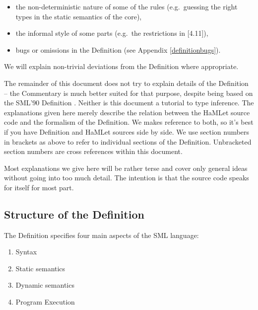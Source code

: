 \documentclass[twoside,titlepage]{article}
\begin{document}
\begin{itemize}
\setlength{\parskip}{0ex}
\item the non-deterministic nature of some of the rules (e.g.\ guessing the right types in the static semantics of the core),
\item the informal style of some parts (e.g.\ the restrictions in [4.11]),
\item bugs or omissions in the Definition (see Appendix \ref{definitionbugs}).
\end{itemize}

We will explain non-trivial deviations from the Definition where appropriate.

The remainder of this document does not try to explain details of the Definition -- the Commentary \cite{commentary} is much better suited for that purpose, despite being based on the SML'90 Definition \cite{definition90}. Neither is this document a tutorial to type inference. The explanations given here merely describe the relation between the HaMLet source code and the formalism of the Definition. We makes reference to both, so it's best if you have Definition and HaMLet sources side by side. We use section numbers in brackets as above to refer to individual sections of the Definition. Unbracketed section numbers are cross references within this document.

Most explanations we give here will be rather terse and cover only general ideas without going into too much detail. The intention is that the source code speaks for itself for most part.


\subsection{Structure of the Definition}
\label{definitionstructure}

The Definition specifies four main aspects of the SML language:

\begin{enumerate}[nolistsep]
\item Syntax
\item Static semantics
\item Dynamic semantics
\item Program Execution
\end{enumerate}
\end{document}
